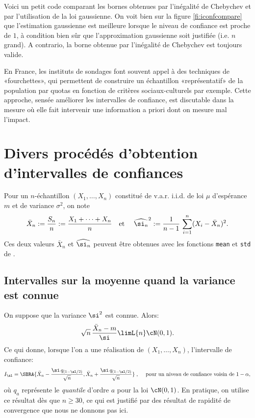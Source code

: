 Voici un petit code \ML{} comparant les bornes obtenues par l'inégalité de
Chebychev et par l'utilisation de la loi gaussienne. On voit bien sur la
figure \ref{fi:iconfcompare} que l'estimation gaussienne est meilleure
lorsque le niveau de confiance est proche de $1$, à condition bien sûr que
l'approximation gaussienne soit justifiée (i.e. $n$ grand). A contrario, la
borne obtenue par l'inégalité de Chebychev est toujours valide.

%
%
%

\begin{rem}
  En France, les instituts de sondages font souvent appel à des techniques de
  «fourchettes», qui permettent de construire un échantillon «représentatif»
  de la population par quotas en fonction de critères sociaux-culturels par
  exemple.  Cette approche, sensée améliorer les intervalles de confiance, est
  discutable dans la mesure où elle fait intervenir une information a priori
  dont on mesure mal l'impact.
\end{rem}

%
\section{Divers procédés d'obtention d'intervalles de confiances}
%

Pour un $n$-échantillon $(X_1,\ldots,X_n)$ constitué de v.a.r. i.i.d. de loi
$\mu$ d'espérance $m$ et de variance $\sigma^2$, on note
$$
\bar{X}_n := \frac{S_n}{n}:=\frac{X_1+\cdots+X_n}{n} 
\text{\quad et \quad}
\widehat{\si_n}^2:=\frac{1}{n-1}\,\sum_{i=1}^n (X_i-\bar{X}_n)^2.
$$
Ces deux valeurs $\bar{X}_n$ et $\widehat{\si_n}$ peuvent être obtenues avec
les fonctions \texttt{mean} et \texttt{std} de \ML.

%
\subsection{Intervalles sur la moyenne quand la variance est connue} 
%

On suppose que la variance $\si^2$ est connue. Alors:
$$
\sqrt{n}\,\frac{\bar{X}_n -m}{\si} \limL{n} \cN(0,1).
$$
Ce qui donne, lorsque l'on a une réalisation de $(X_1,\ldots,X_n)$,
l'intervalle de confiance:
$$
I_\al=\SBRA{\bar{X}_n-\frac{\si \, q_{(1-\al/2)}}{\sqrt{n}},
  \bar{X}_n+\frac{\si \, q_{(1-\al/2)}}{\sqrt{n}}} \;,\;
\text{\quad pour un niveau de confiance voisin de $1-\alpha$},  
$$
où $q_a$ représente le \emph{quantile} d'ordre $a$ pour la loi $\cN(0,1)$.
En pratique, on utilise ce résultat dès que $n \geq 30$, ce qui est justifié
par des résultat de rapidité de convergence que nous ne donnons pas ici.

